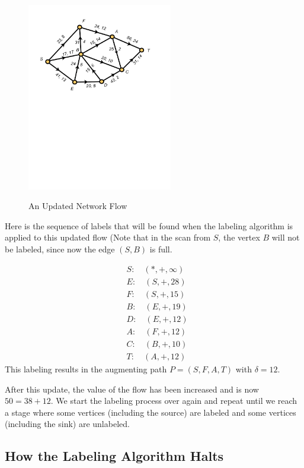 \begin{figure}
\begin{center}
\includegraphics*[viewport=37 410 531 734,width=2.5in]{networkflow-figs/webfig-31c}\\
\caption{An Updated Network Flow}\label{fig:networkflow:updated-flow}
\end{center}
\end{figure}

Here is the sequence of labels that will be found when the labeling
algorithm is applied to this updated flow (Note that in the scan from
$S$, the vertex $B$ will not be labeled, since now the edge
$(S,B)$ is full.

\begin{align*}
  &S:\quad(*,+,\infty)\\
  &E:\quad(S,+,28)\\
  &F:\quad(S,+,15)\\
  &B:\quad(E,+,19)\\
  &D:\quad(E,+,12)\\
  &A:\quad(F,+,12)\\
  &C:\quad(B,+,10)\\
  &T:\quad(A,+,12)
\end{align*} 
This labeling results in the augmenting path $P=(S,F,A,T)$ with
$\delta=12$.

After this update, the value of the flow has been increased and
is now $50=38+12$.
We start the labeling process over again and
repeat until we reach a stage where some vertices
(including the source) are labeled and some vertices (including
the sink) are unlabeled.

\subsection{How the Labeling Algorithm Halts}


